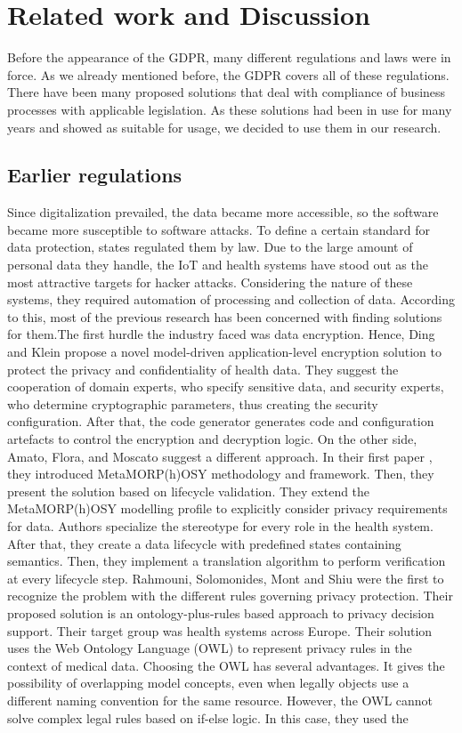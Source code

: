 \documentclass[11pt,english]{article}
\begin{document}
\section{Related work and Discussion}
Before the appearance of the GDPR, many different regulations and laws were in force. As we already mentioned before, the GDPR covers all of these regulations.  There have been many proposed solutions that deal with compliance of business processes with applicable legislation. As these solutions had been in use for many years and showed as suitable for usage, we decided to use them in our research.
\subsection{Earlier regulations}
Since digitalization prevailed, the data became more accessible, so the software became more susceptible to software attacks. To define a certain standard for data protection, states regulated them by law. Due to the large amount of personal data they handle, the IoT \cite{iot} and health systems have stood out as the most attractive targets for hacker attacks. Considering the nature of these systems, they required automation of processing and collection of data.  According to this, most of the previous research has been concerned with finding solutions for them.\newline The first hurdle the industry faced was data encryption. Hence, Ding and Klein \cite{encryptionLevel} propose a novel model-driven application-level encryption solution to protect the privacy and confidentiality of health data. They suggest the cooperation of domain experts, who specify sensitive data, and security experts, who determine cryptographic parameters, thus creating the security configuration. After that, the code generator generates code and configuration artefacts to control the encryption and decryption logic. On the other side, Amato, Flora, and Moscato suggest a different approach. In their first paper \cite{6245777}, they introduced MetaMORP(h)OSY methodology and framework. Then, they present the solution \cite{amato2015model} based on lifecycle validation. They extend the MetaMORP(h)OSY modelling profile to explicitly consider privacy requirements for data. Authors specialize the stereotype for every role in the health system. After that, they create a data lifecycle with predefined states containing semantics. Then, they implement a translation algorithm to perform verification at every lifecycle step. \newline Rahmouni, Solomonides, Mont and Shiu \cite{rahmouni2011model} were the first to recognize the problem with the different rules governing privacy protection. Their proposed solution is an ontology-plus-rules based approach to privacy decision support. Their target group was health systems across Europe. Their solution uses the Web Ontology Language (OWL) \cite{owl} to represent privacy rules in the context of medical data. Choosing the OWL has several advantages. It gives the possibility of overlapping model concepts, even when legally objects use a different naming convention for the same resource. However, the OWL cannot solve complex legal rules based on if-else logic. In this case, they used the 
\end{document}
